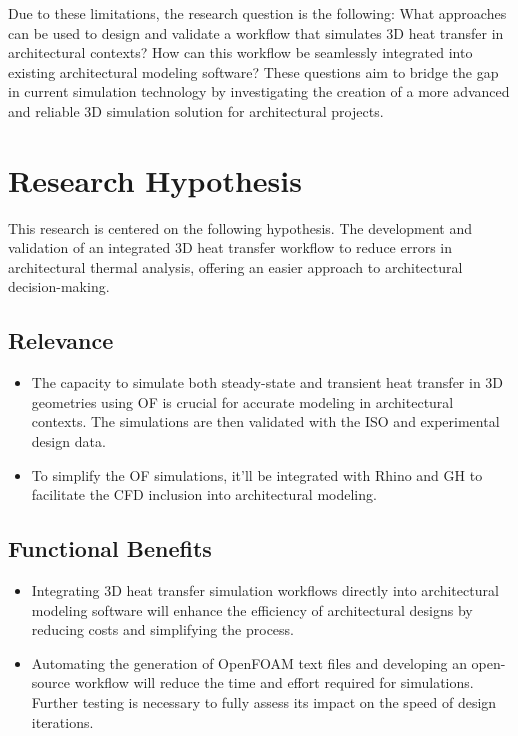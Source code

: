 Due to these limitations, the research question is the following: What approaches can be used to design and validate a workflow that simulates 3D heat transfer in architectural contexts? How can this workflow be seamlessly integrated into existing architectural modeling software? These questions aim to bridge the gap in current simulation technology by investigating the creation of a more advanced and reliable 3D simulation solution for architectural projects.

\section{Research Hypothesis}
This research is centered on the following hypothesis.
The development and validation of an integrated 3D heat transfer workflow to reduce errors in architectural thermal analysis, offering an easier approach to architectural decision-making.

\subsection{Relevance}
\begin{itemize}
    \item The capacity to simulate both steady-state and transient heat transfer in \gls{3D} geometries using \gls{OF} is crucial for accurate modeling in architectural contexts. The simulations are then validated with the \gls{ISO} and experimental design data.
   
    \item To simplify the OF simulations, it'll be integrated with \gls{Rhino} and \gls{GH} to facilitate the \gls{CFD} inclusion into architectural modeling.
\end{itemize}


\subsection{Functional Benefits}
\begin{itemize}
   \item Integrating 3D heat transfer simulation workflows directly into architectural modeling software will enhance the efficiency of architectural designs by reducing costs and simplifying the process.
 
   \item Automating the generation of OpenFOAM text files and developing an open-source workflow will reduce the time and effort required for simulations. Further testing is necessary to fully assess its impact on the speed of design iterations.

\end{itemize}

